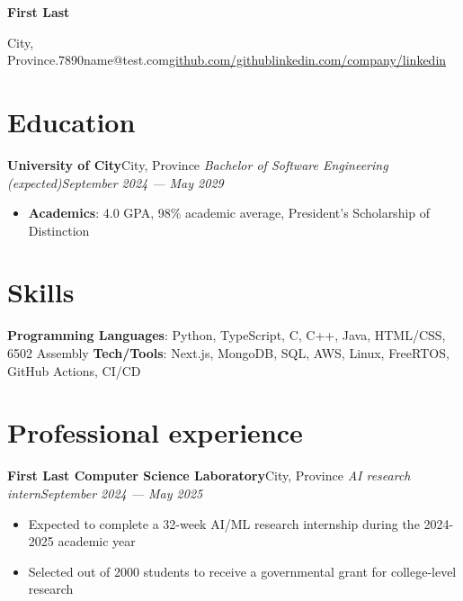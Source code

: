 \documentclass{article}
\newcommand{\cdelim}{\;\textbar\;}
\newcommand{\newrole}[4]{
    {\normalfont\textbf{#1}\hfill#3}
    \newline
    \textit{#2}\hfill\textit{#4}
}
\newenvironment{bulletpoints}{\begin{itemize}\setlength\itemsep{-0.2em}}{\end{itemize}}
\begin{document}
\begin{center}
    {\Huge\bfseries First Last}\\\vspace*{2pt}

    City, Province\cdelim 123.456.7890\cdelim name@test.com\cdelim\href{https://github.com/github}{github.com/github}\cdelim\href{https://linkedin.com/company/linkedin}{linkedin.com/company/linkedin}\\
\end{center}

\section*{Education}

\newrole{University of City}{Bachelor of Software Engineering (expected)}{City, Province}{September 2024 --- May 2029}
\begin{bulletpoints}
    \vspace*{-2pt}
    \item {\bfseries Academics}: 4.0 GPA, 98\% academic average, President's Scholarship of Distinction
\end{bulletpoints}


\section*{Skills}

{\bfseries Programming Languages}: Python, TypeScript, C, C++, Java, HTML/CSS, 6502 Assembly
\newline
{\bfseries Tech/Tools}: Next.js, MongoDB, SQL, AWS, Linux, FreeRTOS, GitHub Actions, CI/CD


\section*{Professional experience}

\newrole{First Last Computer Science Laboratory}{AI research intern}{City, Province}{September 2024 --- May 2025}
\begin{bulletpoints}
    \item Expected to complete a 32-week AI/ML research internship during the 2024-2025 academic year
    \item Selected out of 2000 students to receive a governmental grant for college-level research
\end{bulletpoints}
\end{document}
